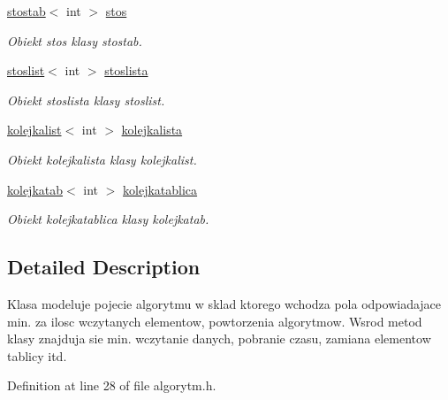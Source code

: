 \begin{DoxyCompactItemize}
\hyperlink{classstostab}{stostab}$<$ int $>$ \hyperlink{classalgorytm_a1829772ca4b928e0df0e4af2fcf907ca}{stos}
\begin{DoxyCompactList}\small\item\em Obiekt stos klasy stostab. \end{DoxyCompactList}\item 
\hyperlink{classstoslist}{stoslist}$<$ int $>$ \hyperlink{classalgorytm_a334d547b11514cc290ea0395df44eda2}{stoslista}
\begin{DoxyCompactList}\small\item\em Obiekt stoslista klasy stoslist. \end{DoxyCompactList}\item 
\hyperlink{classkolejkalist}{kolejkalist}$<$ int $>$ \hyperlink{classalgorytm_a88d3998fb7af950b9bebe97898b7ab7a}{kolejkalista}
\begin{DoxyCompactList}\small\item\em Obiekt kolejkalista klasy kolejkalist. \end{DoxyCompactList}\item 
\hyperlink{classkolejkatab}{kolejkatab}$<$ int $>$ \hyperlink{classalgorytm_aefc3de70ca1ac1bf1ff0598229ddb915}{kolejkatablica}
\begin{DoxyCompactList}\small\item\em Obiekt kolejkatablica klasy kolejkatab. \end{DoxyCompactList}\end{DoxyCompactItemize}


\subsection{Detailed Description}
Klasa modeluje pojecie algorytmu w sklad ktorego wchodza pola odpowiadajace min. za ilosc wczytanych elementow, powtorzenia algorytmow. Wsrod metod klasy znajduja sie min. wczytanie danych, pobranie czasu, zamiana elementow tablicy itd. 

Definition at line 28 of file algorytm.\-h.



